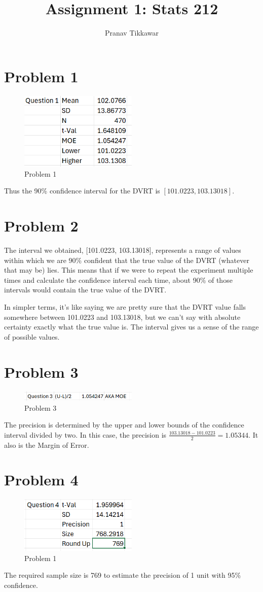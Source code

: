 \documentclass{article}
\author{Pranav Tikkawar}
\title{Assignment 1: Stats 212}
\begin{document}
\maketitle
\section*{Problem 1}
\begin{figure}[h]
    \centering
    \includegraphics[width=0.5\textwidth]{A1img/Q1.png}
    \caption{Problem 1}
    \label{fig:Q1}
\end{figure}
Thus the 90\% confidence interval for the DVRT is $[101.0223, 103.13018]$.

\section*{Problem 2}
The interval we obtained, [101.0223, 103.13018], represents a range of values within which we are 90\% confident that the true value of the DVRT (whatever that may be) lies. This means that if we were to repeat the experiment multiple times and calculate the confidence interval each time, about 90\% of those intervals would contain the true value of the DVRT.

In simpler terms, it's like saying we are pretty sure that the DVRT value falls somewhere between 101.0223 and 103.13018, but we can't say with absolute certainty exactly what the true value is. The interval gives us a sense of the range of possible values.
\section*{Problem 3}
\begin{figure}[h]
    \centering
    \includegraphics[width=0.5\textwidth]{A1img/Q3.png}
    \caption{Problem 3}
    \label{fig:Q1}
\end{figure}
The precision is determined by the upper and lower bounds of the confidence interval divided by two. In this case, the precision is $\frac{103.13018 - 101.0223}{2} = 1.05344$. It also is the Margin of Error.

\section*{Problem 4}

\begin{figure}[h]
    \centering
    \includegraphics[width=0.5\textwidth]{A1img/Q4.png}
    \caption{Problem 1}
    \label{fig:Q3}
\end{figure}
The required sample size is 769 to estimate the precision of 1 unit with 95\% confidence.
\end{document}
